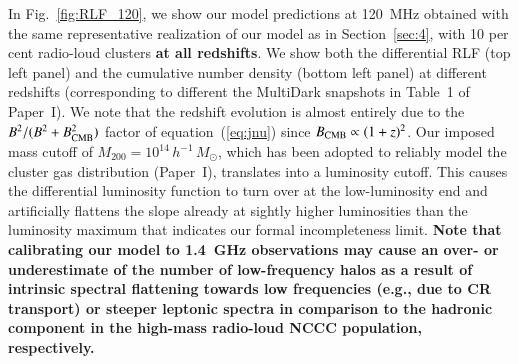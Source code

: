 \documentclass[useAMS,usenatbib]{mn2e}
\begin{document}
In Fig.~\ref{fig:RLF_120}, we show our model predictions at 120~MHz obtained
with the same representative realization of our model as in Section~\ref{sec:4},
with 10 per cent radio-loud clusters {\bf at all redshifts}. We show both the
differential RLF (top left panel) and the cumulative number density (bottom left
panel) at different redshifts (corresponding to different the MultiDark
snapshots in Table~1 of Paper~I).  We note that the redshift evolution is almost
entirely due to the $B^2/(B^2+B_{{\mathrm{CMB}}}^2)$ factor of
equation~(\ref{eq:jnu}) since $B_{\mathrm{CMB}}\propto (1+z)^2$.  Our imposed mass
cutoff of $M_{200}=10^{14}\,h^{-1}\,M_\odot$, which has been adopted to reliably
model the cluster gas distribution (Paper~I), translates into a luminosity
cutoff. This causes the differential luminosity function to turn over at the
low-luminosity end and artificially flattens the slope already at sightly higher
luminosities than the luminosity maximum that indicates our formal
incompleteness limit.  {\bf Note that calibrating our model to 1.4~GHz
  observations may cause an over- or underestimate of the number of
  low-frequency halos as a result of intrinsic spectral flattening towards low
  frequencies (e.g., due to CR transport) or steeper leptonic spectra in
  comparison to the hadronic component in the high-mass radio-loud NCCC
  population, respectively.}
\end{document}
